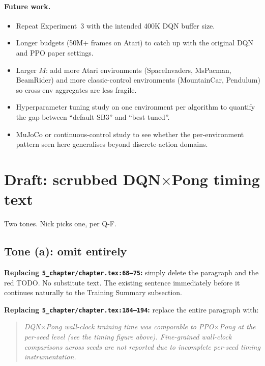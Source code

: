 \documentclass[11pt,a4paper]{article}
\newcommand{\fileline}[1]{\texttt{\small #1}}
\begin{document}
\paragraph{Future work.}
\begin{itemize}[leftmargin=*]
  \item Repeat Experiment~3 with the intended 400K DQN buffer size.
  \item Longer budgets (50M+ frames on Atari) to catch up with the
  original DQN and PPO paper settings.
  \item Larger $M$: add more Atari environments (SpaceInvaders, MsPacman,
  BeamRider) and more classic-control environments (MountainCar,
  Pendulum) so cross-env aggregates are less fragile.
  \item Hyperparameter tuning study on one environment per algorithm to
  quantify the gap between ``default SB3'' and ``best tuned''.
  \item MuJoCo or continuous-control study to see whether the
  per-environment pattern seen here generalises beyond discrete-action
  domains.
\end{itemize}

\section{Draft: scrubbed DQN$\times$Pong timing text}\label{sec:scrub}

Two tones. Nick picks one, per Q-F.

\subsection*{Tone (a): omit entirely}

\textbf{Replacing \fileline{5\_chapter/chapter.tex:68--75}:} simply
delete the paragraph and the red TODO. No substitute text. The existing
sentence immediately before it continues naturally to the Training
Summary subsection.

\textbf{Replacing \fileline{5\_chapter/chapter.tex:184--194}:} replace
the entire paragraph with:

\begin{quote}
\textit{DQN$\times$Pong wall-clock training time was comparable to
PPO$\times$Pong at the per-seed level (see the timing figure above).
Fine-grained wall-clock comparisons across seeds are not reported due
to incomplete per-seed timing instrumentation.}
\end{quote}
\end{document}
